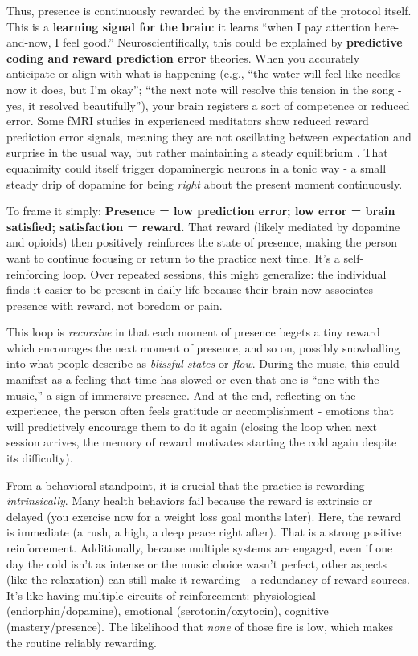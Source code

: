 \documentclass[11pt]{article}
\newcommand{\quotes}[1]{``#1''}
\begin{document}
Thus, presence is continuously rewarded by the environment of the protocol itself. This is a \textbf{learning signal for the brain}: it learns \quotes{when I pay attention here-and-now, I feel good.} Neuroscientifically, this could be explained by \textbf{predictive coding and reward prediction error} theories. When you accurately anticipate or align with what is happening (e.g., \quotes{the water will feel like needles - now it does, but I'm okay}; \quotes{the next note will resolve this tension in the song - yes, it resolved beautifully}), your brain registers a sort of competence or reduced error. Some fMRI studies in experienced meditators show reduced reward prediction error signals, meaning they are not oscillating between expectation and surprise in the usual way, but rather maintaining a steady equilibrium \cite{KirkUlrich}. That equanimity could itself trigger dopaminergic neurons in a tonic way - a small steady drip of dopamine for being \textit{right} about the present moment continuously. 

To frame it simply: \textbf{Presence = low prediction error; low error = brain satisfied; satisfaction = reward.} That reward (likely mediated by dopamine and opioids) then positively reinforces the state of presence, making the person want to continue focusing or return to the practice next time. It's a self-reinforcing loop. Over repeated sessions, this might generalize: the individual finds it easier to be present in daily life because their brain now associates presence with reward, not boredom or pain.

This loop is \textit{recursive} in that each moment of presence begets a tiny reward which encourages the next moment of presence, and so on, possibly snowballing into what people describe as \textit{blissful states} or \textit{flow}. During the music, this could manifest as a feeling that time has slowed or even that one is \quotes{one with the music,} a sign of immersive presence. And at the end, reflecting on the experience, the person often feels gratitude or accomplishment - emotions that will predictively encourage them to do it again (closing the loop when next session arrives, the memory of reward motivates starting the cold again despite its difficulty).

From a behavioral standpoint, it is crucial that the practice is rewarding \textit{intrinsically}. Many health behaviors fail because the reward is extrinsic or delayed (you exercise now for a weight loss goal months later). Here, the reward is immediate (a rush, a high, a deep peace right after). That is a strong positive reinforcement. Additionally, because multiple systems are engaged, even if one day the cold isn't as intense or the music choice wasn't perfect, other aspects (like the relaxation) can still make it rewarding - a redundancy of reward sources. It's like having multiple circuits of reinforcement: physiological (endorphin/dopamine), emotional (serotonin/oxytocin), cognitive (mastery/presence). The likelihood that \textit{none} of those fire is low, which makes the routine reliably rewarding.
\end{document}
